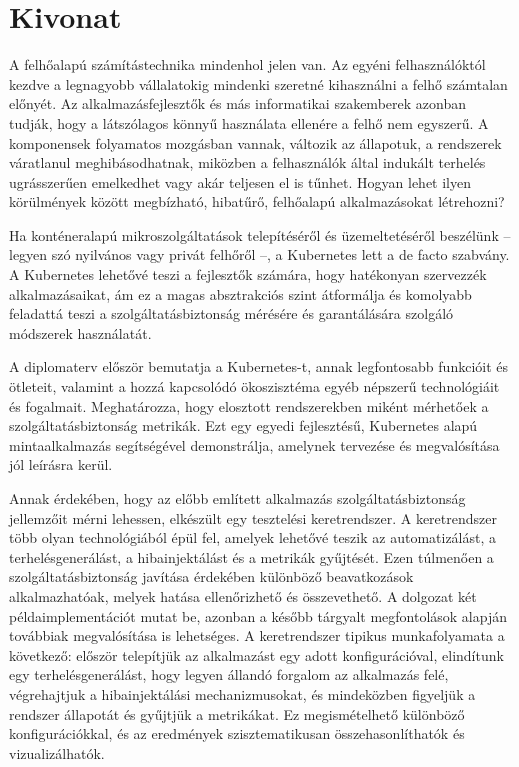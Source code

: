 \setcounter{page}{1}

\selecthungarian

\chapter*{Kivonat}

A felhőalapú számítástechnika mindenhol jelen van. Az egyéni felhasználóktól kezdve a legnagyobb vállalatokig mindenki szeretné kihasználni a felhő számtalan előnyét. Az alkalmazásfejlesztők és más informatikai szakemberek azonban tudják, hogy a látszólagos könnyű használata ellenére a felhő nem egyszerű. A komponensek folyamatos mozgásban vannak, változik az állapotuk, a rendszerek váratlanul meghibásodhatnak, miközben a felhasználók által indukált terhelés ugrásszerűen emelkedhet vagy akár teljesen el is tűnhet. Hogyan lehet ilyen körülmények között megbízható, hibatűrő, felhőalapú alkalmazásokat létrehozni?

Ha konténeralapú mikroszolgáltatások telepítéséről és üzemeltetéséről beszélünk -- legyen szó nyilvános vagy privát felhőről --, a Kubernetes lett a de facto szabvány. A Kubernetes lehetővé teszi a fejlesztők számára, hogy hatékonyan szervezzék alkalmazásaikat, ám ez a magas absztrakciós szint átformálja és komolyabb feladattá teszi a szolgáltatásbiztonság mérésére és garantálására szolgáló módszerek használatát.

A diplomaterv először bemutatja a Kubernetes-t, annak legfontosabb funkcióit és ötleteit, valamint a hozzá kapcsolódó ökoszisztéma egyéb népszerű technológiáit és fogalmait. Meghatározza, hogy elosztott rendszerekben miként mérhetőek a szolgáltatásbiztonság metrikák. Ezt egy egyedi fejlesztésű, Kubernetes alapú mintaalkalmazás segítségével demonstrálja, amelynek tervezése és megvalósítása jól leírásra kerül.

Annak érdekében, hogy az előbb említett alkalmazás szolgáltatásbiztonság jellemzőit mérni lehessen, elkészült egy tesztelési keretrendszer. A keretrendszer több olyan technológiából épül fel, amelyek lehetővé teszik az automatizálást, a terhelésgenerálást, a hibainjektálást és a metrikák gyűjtését. Ezen túlmenően a szolgáltatásbiztonság javítása érdekében különböző beavatkozások alkalmazhatóak, melyek hatása ellenőrizhető és összevethető. A dolgozat két példaimplementációt mutat be, azonban a később tárgyalt megfontolások alapján továbbiak megvalósítása is lehetséges. A keretrendszer tipikus munkafolyamata a következő: először telepítjük az alkalmazást egy adott konfigurációval, elindítunk egy terhelésgenerálást, hogy legyen állandó forgalom az alkalmazás felé, végrehajtjuk a hibainjektálási mechanizmusokat, és mindeközben figyeljük a rendszer állapotát és gyűjtjük a metrikákat. Ez megismételhető különböző konfigurációkkal, és az eredmények szisztematikusan összehasonlíthatók és vizualizálhatók.


